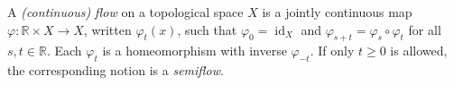 
A \emph{(continuous) flow} on a topological space $X$ is a jointly continuous map $\varphi:\mathbb R\times X\to X$, written $\varphi_t(x)$, such that $\varphi_0=\operatorname{id}_X$ and $\varphi_{s+t}=\varphi_s\circ\varphi_t$ for all $s,t\in\mathbb R$. Each $\varphi_t$ is a homeomorphism with inverse $\varphi_{-t}$. If only $t\ge0$ is allowed, the corresponding notion is a \emph{semiflow}.

